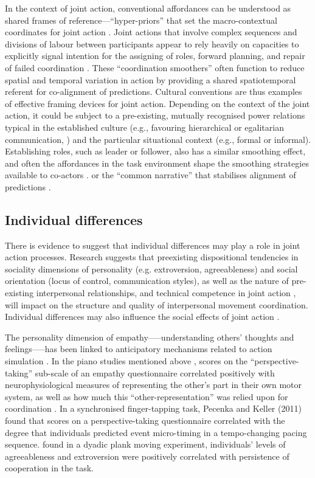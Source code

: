 \begin{CJK}{UTF8}{gbsn}
In the context of joint action, conventional affordances can be understood as shared frames of reference---``hyper-priors'' that set the macro-contextual coordinates for joint action \citep{Clark2013}. Joint actions that involve complex sequences and divisions of labour between participants appear to rely heavily on capacities to explicitly signal intention for the assigning of roles, forward planning, and repair of failed coordination \citep{Frith2010}.  These ``coordination smoothers'' \citep{Vesper2017} often function to reduce spatial and temporal variation in action by providing a shared spatiotemporal referent for co-alignment of predictions.  Cultural conventions are thus examples of effective framing devices for joint action.  Depending on the context of the joint action, it could be subject to a pre-existing, mutually recognised power relations typical in the established culture (e.g., favouring hierarchical or egalitarian communication, \citep[see]{Cheon2011}) and the particular situational context (e.g., formal or informal).  Establishing roles, such as leader or follower, also has a similar smoothing effect, and often the affordances in the task environment shape the smoothing strategies available to co-actors \citep{Marsh2009}.
or the ``common narrative'' that stabilises alignment of predictions \citep{Friston2015}.


\subsection{Individual differences\label{sect:individualDifferences}}

There is evidence to suggest that individual differences may play a role in joint action processes.  Research suggests that preexisting dispositional tendencies in sociality dimensions of personality (e.g. extroversion, agreeableness) and social orientation (locus of control, communication styles), as well as the nature of pre-existing interpersonal relationships, and technical competence in joint action \citep{Novembre2014}, will impact on the structure and quality of interpersonal movement coordination.  Individual differences may also influence the social effects of joint action \citep{Marsh2009}.

The personality dimension of empathy—--understanding others’ thoughts and feelings—--has been linked to anticipatory mechanisms related to action simulation \citep{Sevdalis2014,Keller2014}.  In the piano studies mentioned above \citep{Novembre2012}, scores on the ``perspective-taking'' sub-scale of an empathy questionnaire correlated positively with neurophysiological measures of representing the other’s part in their own motor system, as well as how much this ``other-representation'' was relied upon for coordination \citep{Novembre2014a}.  In a synchronised finger-tapping task, Pecenka and Keller (2011) found that scores on a perspective-taking questionnaire correlated with the degree that individuals predicted event micro-timing in a tempo-changing pacing sequence.  \textcite{Richardson2007} found in a dyadic plank moving experiment, individuals’ levels of agreeableness and extroversion were positively correlated with persistence of cooperation in the task.


\end{CJK}
